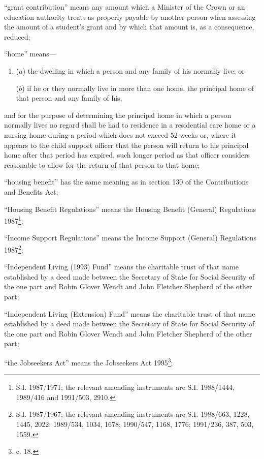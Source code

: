 \documentclass[a4paper]{article}
\begin{document}
\begin{enumerate}
“grant contribution” means any amount which a Minister of the Crown or an education authority treats as properly payable by another person when assessing the amount of a student’s grant and by which that amount is, as a consequence, reduced;

“home” means—
\begin{enumerate}\item[]
($a$)
the dwelling in which a person and any family of his normally live; or

($b$)
if he or they normally live in more than one home, the principal home of that person and any family of his,
\end{enumerate}
and for the purpose of determining the principal home in which a person normally lives no regard shall be had to residence in a residential care home or a nursing home during a period which does not exceed 52 weeks or, where it appears to the child support officer that the person will return to his principal home after that period has expired, such longer period as that officer considers reasonable to allow for the return of that person to that home;

“housing benefit” has the same meaning as in section 130 of the Contributions and Benefits Act;

“Housing Benefit Regulations” means the Housing Benefit (General) Regulations 1987\footnote{\frenchspacing S.I. 1987/1971; the relevant amending instruments are S.I. 1988/1444, 1989/416 and 1991/503, 2910.};

“Income Support Regulations” means the Income Support (General) Regulations 1987\footnote{\frenchspacing S.I. 1987/1967; the relevant amending instruments are S.I. 1988/663, 1228, 1445, 2022; 1989/534, 1034, 1678; 1990/547, 1168, 1776; 1991/236, 387, 503, 1559.};

“Independent Living (1993) Fund” means the charitable trust of that name established by a deed made between the Secretary of State for Social Security of the one part and Robin Glover Wendt and John Fletcher Shepherd of the other part;

“Independent Living (Extension) Fund” means the charitable trust of that name established by a deed made between the Secretary of State for Social Security of the one part and Robin Glover Wendt and John Fletcher Shepherd of the other part;

“the Jobseekers Act” means the Jobseekers Act 1995\footnote{ c. 18.};


\end{enumerate}
\end{document}
